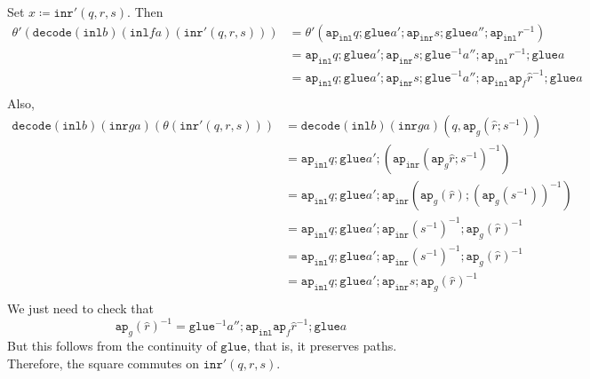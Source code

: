 \documentclass[12pt]{amsart}
\newcommand{\inv}{^{-1}}
\newcommand{\type}[1]{\mathtt{#1}}
\newcommand{\ap}{\type{ap}}
\newcommand{\inl}{\type{inl}}
\newcommand{\inr}{\type{inr}}
\newcommand{\glue}{\type{glue}}
\newcommand{\decode}{\type{decode}}
\theoremstyle{remark}
\theoremstyle{definition}
\begin{document}
Set
\(
  x \coloneqq \inr' ( q,r,s ).
\)
Then
\begin{align*}
  \theta' ( \decode ( \inl b ) ( \inl fa ) ( \inr' ( q,r,s ) ) )
  & = \theta' ( \ap_{\inl} q ; \glue a' ; \ap_{\inr} s ; \glue a'' ;
    \ap_{\inl} r^{-1} ) \\
  & =  \ap_{\inl} q ; \glue a' ; \ap_{\inr} s ; \glue^{-1} a'' ;
    \ap_{\inl} r^{-1} ; \glue a \\
   & =  \ap_{\inl} q ; \glue a' ; \ap_{\inr} s ; \glue^{-1} a'' ;
    \ap_{\inl} \ap_f \hat{r}^{-1} ; \glue a \\
\end{align*}
%
Also,
%
\begin{align*}
  \decode ( \inl b ) ( \inr ga ) ( \theta ( \inr' ( q,r,s ) ) )
  & = \decode ( \inl b )( \inr ga )( q , \ap_g ( \hat{r} ; s^{-1}
    ) ) \\
  & = \ap_{\inl} q ; \glue a' ; ( \ap_{\inr} ( \ap_g \hat{r} ; s^{-1} )^{-1} ) \\
  & = \ap_{\inl} q ; \glue a' ; \ap_{\inr} ( \ap_g ( \hat{r} ) ; ( \ap_g
    (s^{-1}) )^{-1} ) \\
  & = \ap_{\inl} q ; \glue a' ; \ap_{\inr} (s^{-1})^{-1} ;  \ap_g ( \hat{r} )^{-1} \\
  & = \ap_{\inl} q ; \glue a' ; \ap_{\inr} (s^{-1})^{-1} ;  \ap_g ( \hat{r} )^{-1} \\
  & = \ap_{\inl} q ; \glue a' ; \ap_{\inr} s ;  \ap_g ( \hat{r} )^{-1} \\
\end{align*}
%
We just need to check that
\[
  \ap_g ( \hat{r} )\inv =
  \glue\inv a'' ; \ap_{ \inl } \ap_f \hat{r}\inv ; \glue a
\]
But this follows from the continuity of \( \glue \), that is, it
preserves paths. Therefore, the square commutes on
\(
  \inr' ( q,r,s ).
\)
\end{document}
